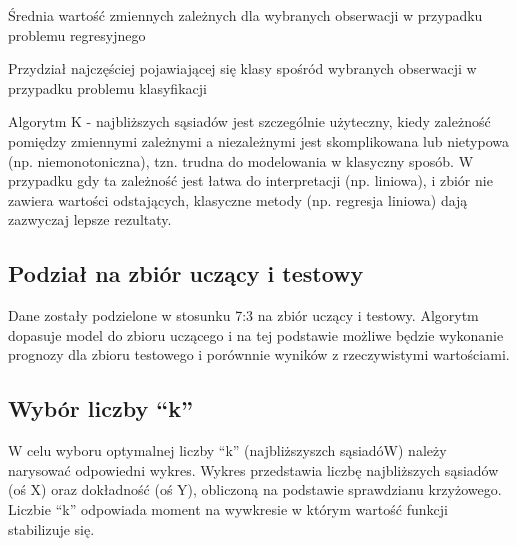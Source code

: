 \documentclass[]{article}
\newenvironment{Shaded}{\begin{snugshade}}{\end{snugshade}}
\newcommand{\KeywordTok}[1]{\textcolor[rgb]{0.13,0.29,0.53}{\textbf{#1}}}
\newcommand{\DataTypeTok}[1]{\textcolor[rgb]{0.13,0.29,0.53}{#1}}
\newcommand{\DecValTok}[1]{\textcolor[rgb]{0.00,0.00,0.81}{#1}}
\newcommand{\FloatTok}[1]{\textcolor[rgb]{0.00,0.00,0.81}{#1}}
\newcommand{\StringTok}[1]{\textcolor[rgb]{0.31,0.60,0.02}{#1}}
\newcommand{\OtherTok}[1]{\textcolor[rgb]{0.56,0.35,0.01}{#1}}
\newcommand{\OperatorTok}[1]{\textcolor[rgb]{0.81,0.36,0.00}{\textbf{#1}}}
\newcommand{\NormalTok}[1]{#1}
\begin{document}
Średnia wartość zmiennych zależnych dla wybranych obserwacji w przypadku
problemu regresyjnego

Przydział najczęściej pojawiającej się klasy spośród wybranych
obserwacji w przypadku problemu klasyfikacji

Algorytm K - najbliższych sąsiadów jest szczególnie użyteczny, kiedy
zależność pomiędzy zmiennymi zależnymi a niezależnymi jest skomplikowana
lub nietypowa (np. niemonotoniczna), tzn. trudna do modelowania w
klasyczny sposób. W przypadku gdy ta zależność jest łatwa do
interpretacji (np. liniowa), i zbiór nie zawiera wartości odstających,
klasyczne metody (np. regresja liniowa) dają zazwyczaj lepsze rezultaty.

\subsection{Podział na zbiór uczący i
testowy}\label{podzia-na-zbior-uczacy-i-testowy}

Dane zostały podzielone w stosunku 7:3 na zbiór uczący i testowy.
Algorytm dopasuje model do zbioru uczącego i na tej podstawie możliwe
będzie wykonanie prognozy dla zbioru testowego i porównnie wyników z
rzeczywistymi wartościami.

\begin{Shaded}
\end{Shaded}

\subsection{\texorpdfstring{Wybór liczby
``k''}{Wybór liczby k}}\label{wybor-liczby-k}

W celu wyboru optymalnej liczby ``k'' (najbliższyszch sąsiadóW) należy
narysować odpowiedni wykres. Wykres przedstawia liczbę najbliższych
sąsiadów (oś X) oraz dokładność (oś Y), obliczoną na podstawie
sprawdzianu krzyżowego. Liczbie ``k'' odpowiada moment na wywkresie w
którym wartość funkcji stabilizuje się.
\end{document}
